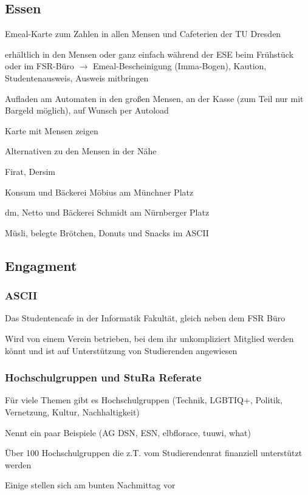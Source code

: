 \documentclass[a4paper,12pt]{report}
\begin{document}
\subsection{Essen}
\begin{itemize*}
	\item Emeal-Karte zum Zahlen in allen Mensen und Cafeterien der TU Dresden
	\item erhältlich in den Mensen oder ganz einfach während der ESE beim Frühstück oder im FSR-Büro
	$\rightarrow$ Emeal-Bescheinigung (Imma-Bogen),  Kaution, Studentenausweis, Ausweis mitbringen
	\item Aufladen am Automaten in den großen Mensen, an der Kasse (zum Teil nur mit Bargeld möglich), auf Wunsch per Autoload
	\item Karte mit Mensen zeigen
	\item Alternativen zu den Mensen in der Nähe
	\begin{itemize*}
		\item Firat, Dersim
		\item Konsum und Bäckerei Möbius am Münchner Platz
		\item dm, Netto und Bäckerei Schmidt am Nürnberger Platz
		\item Müsli, belegte Brötchen, Donuts und Snacks im ASCII
	\end{itemize*}
\end{itemize*}

\subsection{Engagment}

\subsubsection{ASCII}
\begin{itemize*}
	\item Das Studentencafe in der Informatik Fakultät, gleich neben dem FSR Büro
	\item Wird von einem Verein betrieben, bei dem ihr unkompliziert Mitglied werden könnt und ist auf Unterstützung von Studierenden angewiesen
\end{itemize*}

\subsubsection{Hochschulgruppen und StuRa Referate}
\begin{itemize*}
	\item Für viele Themen gibt es Hochschulgruppen (Technik, LGBTIQ+, Politik, Vernetzung, Kultur, Nachhaltigkeit)
	\item Nennt ein paar Beispiele (AG DSN, ESN, elbflorace, tuuwi, what)
	\item Über 100 Hochschulgruppen die z.T. vom Studierendenrat finanziell unterstützt werden
	\item Einige stellen sich am bunten Nachmittag vor
\end{itemize*}
\end{document}
